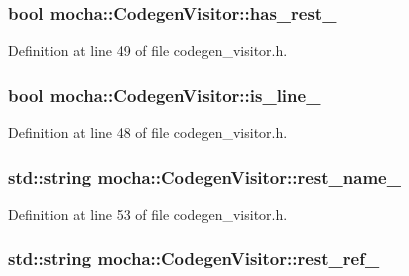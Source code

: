 \hypertarget{classmocha_1_1_codegen_visitor_a2ee0634fdb95ee4150e914a69d894257}{
\subsubsection[{has\_\-rest\_\-}]{\setlength{\rightskip}{0pt plus 5cm}bool {\bf mocha::CodegenVisitor::has\_\-rest\_\-}}}
\label{classmocha_1_1_codegen_visitor_a2ee0634fdb95ee4150e914a69d894257}


Definition at line 49 of file codegen\_\-visitor.h.

\hypertarget{classmocha_1_1_codegen_visitor_af198dc9fecc2e79d9a3d3df0a3e28231}{
\subsubsection[{is\_\-line\_\-}]{\setlength{\rightskip}{0pt plus 5cm}bool {\bf mocha::CodegenVisitor::is\_\-line\_\-}}}
\label{classmocha_1_1_codegen_visitor_af198dc9fecc2e79d9a3d3df0a3e28231}


Definition at line 48 of file codegen\_\-visitor.h.

\hypertarget{classmocha_1_1_codegen_visitor_a9e6cd1c236038c7bf885481added42e5}{
\subsubsection[{rest\_\-name\_\-}]{\setlength{\rightskip}{0pt plus 5cm}std::string {\bf mocha::CodegenVisitor::rest\_\-name\_\-}}}
\label{classmocha_1_1_codegen_visitor_a9e6cd1c236038c7bf885481added42e5}


Definition at line 53 of file codegen\_\-visitor.h.

\hypertarget{classmocha_1_1_codegen_visitor_a54eb17d7aaa77efc93f704f35056a4a0}{
\subsubsection[{rest\_\-ref\_\-}]{\setlength{\rightskip}{0pt plus 5cm}std::string {\bf mocha::CodegenVisitor::rest\_\-ref\_\-}}}
\label{classmocha_1_1_codegen_visitor_a54eb17d7aaa77efc93f704f35056a4a0}


